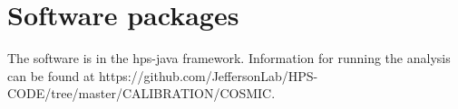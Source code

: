 \documentclass[twoside]{article}
\begin{document}
\section{Software packages}
The software is in the hps-java framework. Information for running the analysis can be found at https://github.com/JeffersonLab/HPS-CODE/tree/master/CALIBRATION/COSMIC.



{}



\end{document}
